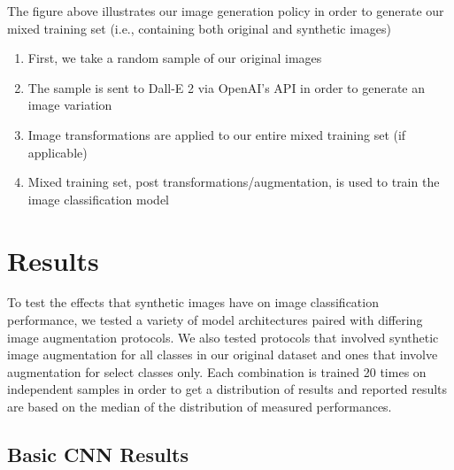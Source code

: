 \documentclass [MS] {uclathes}
\begin{document}
The figure above illustrates our image generation policy in order to generate our mixed training set (i.e., containing 
both original and synthetic images)
\begin{enumerate}
    \item First, we take a random sample of our original images
    \item The sample is sent to Dall-E 2 via OpenAI's API in order to generate an image variation
    \item Image transformations are applied to our entire mixed training set (if applicable)
    \item Mixed training set, post transformations/augmentation, is used to train the image classification model
\end{enumerate}

\chapter{Results}
To test the effects that synthetic images have on image classification performance, we tested a variety of model 
architectures paired with differing image augmentation protocols. We also tested protocols that involved synthetic 
image augmentation for all classes in our original dataset and ones that involve augmentation for select classes only. 
Each combination is trained 20 times on independent samples in order to get a distribution of results and reported 
results are based on the median of the distribution of measured performances.

\section{Basic CNN Results}
\end{document}
